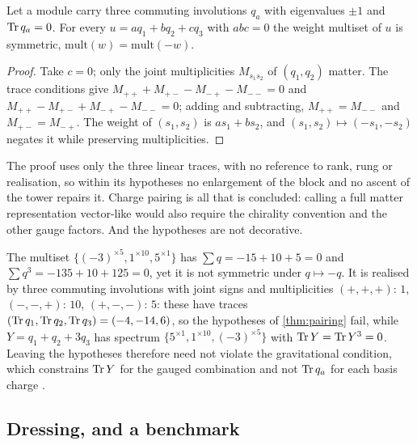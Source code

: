 \begin{theorem}
\label{thm:pairing}
Let a module carry three commuting involutions $q_a$ with eigenvalues $\pm1$ and $\operatorname{Tr} q_a=0$. For every $u=aq_1+bq_2+cq_3$ with
$abc=0$ the weight multiset of $u$ is symmetric, $\mathrm{mult}(w)=\mathrm{mult}(-w)$.
\end{theorem}

\begin{proof}
Take $c=0$; only the joint multiplicities $M_{s_1s_2}$ of $(q_1,q_2)$ matter. The trace conditions give
$M_{++}+M_{+-}-M_{-+}-M_{--}=0$ and $M_{++}-M_{+-}+M_{-+}-M_{--}=0$; adding and subtracting, $M_{++}=M_{--}$ and $M_{+-}=M_{-+}$. The
weight of $(s_1,s_2)$ is $as_1+bs_2$, and $(s_1,s_2)\mapsto(-s_1,-s_2)$ negates it while preserving multiplicities.
\end{proof}

The proof uses only the three linear traces, with no reference to rank, rung or realisation, so within its hypotheses no
enlargement of the block and no ascent of the tower repairs it. Charge pairing is all that is concluded: calling a full matter
representation vector-like would also require the chirality convention and the other gauge factors. And the hypotheses are not
decorative.

\begin{example}
\label{ex:multiset}
The multiset $\{(-3)^{\times5},1^{\times10},5^{\times1}\}$ has $\sum q=-15+10+5=0$ and $\sum q^3=-135+10+125=0$, yet it is not symmetric under
$q\mapsto-q$. It is realised by three commuting involutions with joint signs and multiplicities $(+,+,+){:}\,1$, $(-,-,+){:}\,10$,
$(+,-,-){:}\,5$: these have traces $(\operatorname{Tr} q_1,\operatorname{Tr} q_2,\operatorname{Tr} q_3)=(-4,-14,6)$, so the hypotheses of \cref{thm:pairing} fail, while
$Y=q_1+q_2+3q_3$ has spectrum $\{5^{\times1},1^{\times10},(-3)^{\times5}\}$ with $\operatorname{Tr} Y=\operatorname{Tr} Y^3=0$. Leaving the hypotheses therefore need not
violate the gravitational condition, which constrains $\operatorname{Tr} Y$ for the gauged combination and not $\operatorname{Tr} q_a$ for each basis charge
\cite{AlvarezGaumeWitten,Bilal}.
\end{example}

\subsection{Dressing, and a benchmark}
\label{sec:benchmark}

